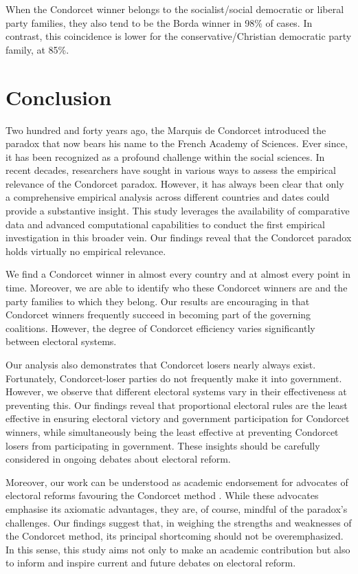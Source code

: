 \documentclass[12pt]{scrartcl}
\begin{document}
When the Condorcet winner belongs to the socialist/social democratic or liberal party families, they also tend to be the Borda winner in 98\% of cases. In contrast, this coincidence is lower for the conservative/Christian democratic party family, at 85\%. 

\section{Conclusion}
Two hundred and forty years ago, the Marquis de Condorcet introduced the paradox that now bears his name to the French Academy of Sciences. Ever since, it has been recognized as a profound challenge within the social sciences. In recent decades, researchers have sought in various ways to assess the empirical relevance of the Condorcet paradox. However, it has always been clear that only a comprehensive empirical analysis across different countries and dates could provide a substantive insight. This study leverages the availability of comparative data and advanced computational capabilities to conduct the first empirical investigation in this broader vein. Our findings reveal that the Condorcet paradox holds virtually no empirical relevance.

We find a Condorcet winner in almost every country and at almost every point in time. Moreover, we are able to identify who these Condorcet winners are and the party families to which they belong. Our results are encouraging in that Condorcet winners frequently succeed in becoming part of the governing coalitions. However, the degree of Condorcet efficiency varies significantly between electoral systems.

Our analysis also demonstrates that Condorcet losers nearly always exist. Fortunately, Condorcet-loser parties do not frequently make it into government. However, we observe that different electoral systems vary in their effectiveness at preventing this. Our findings reveal that proportional electoral rules are the least effective in ensuring electoral victory and government participation for Condorcet winners, while simultaneously being the least effective at preventing Condorcet losers from participating in government. These insights should be carefully considered in ongoing debates about electoral reform.

Moreover, our work can be understood as academic endorsement for advocates of electoral reforms favouring the Condorcet method \citep{Maskin2016, Maskin2017, Maskin2017a}. While these advocates emphasise its axiomatic advantages, they are, of course, mindful of the paradox's challenges. Our findings suggest that, in weighing the strengths and weaknesses of the Condorcet method, its principal shortcoming should not be overemphasized. In this sense, this study aims not only to make an academic contribution but also to inform and inspire current and future debates on electoral reform.
\end{document}
